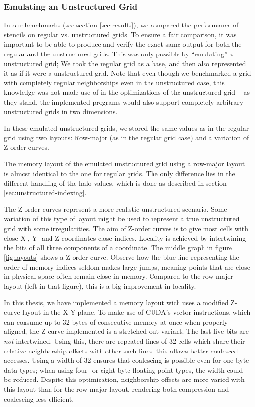 \subsubsection{Emulating an Unstructured Grid}

In our benchmarks (see section \ref{sec:results}), we compared the performance of stencils on regular vs. unstructured grids. To ensure a fair comparison, it was important to be able to produce and verify the exact same output for both the regular and the unstructured grids. This was only possible by ``emulating'' a unstructured grid; We took the regular grid as a base, and then also represented it as if it were a unstructured grid. Note that even though we benchmarked a grid with completely regular neighborships even in the unstructured case, this knowledge was not made use of in the optimizations of the unstructured grid -- as they stand, the implemented programs would also support completely arbitrary unstructured grids in two dimensions.

In these emulated unstructured grids, we stored the same values as in the regular grid using two layouts: Row-major (as in the regular grid case) and a variation of Z-order curves. 

The memory layout of the emulated unstructured grid using a row-major layout is almost identical to the one for regular grids. The only difference lies in the different handling of the halo values, which is done as described in section \ref{sec:unstructured-indexing}. 

The Z-order curves represent a more realistic unstructured scenario. Some variation of this type of layout might be used to represent a true unstructured grid with some irregularities. The aim of Z-order curves is to give most cells with close X-, Y- and Z-coordinates close indices. Locality is achieved by intertwining the bits of all three components of a coordinate. The middle graph in figure \ref{fig:layouts} shows a Z-order curve. Observe how the blue line representing the order of memory indices seldom makes large jumps, meaning points that are close in physical space often remain close in memory. Compared to the row-major layout (left in that figure), this is a big improvement in locality.

In this thesis, we have implemented a memory layout wich uses a modified Z-curve layout in the X-Y-plane. To make use of CUDA's vector instructions, which can consume up to 32 bytes of consecutive memory at once when properly aligned, the Z-curve implemented is a stretched out variant. The last five bits are \emph{not} intertwined. Using this, there are repeated lines of 32 cells which share their relative neighborship offsets with other such lines; this allows better coalesced accesses. Using a width of 32 ensures that coalescing is possible even for one-byte data types; when using four- or eight-byte floating point types, the width could be reduced. Despite this optimization, neighborship offsets are more varied with this layout than for the row-major layout, rendering both compression and coalescing less efficient.

